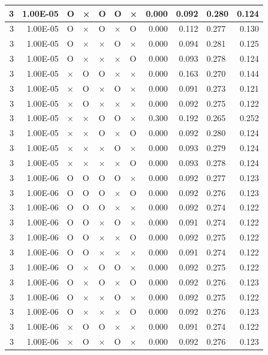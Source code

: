 \documentclass[11pt]{article}
\begin{document}
\begin{longtable}[h]{|r|r|l|l|l|l|l|r|r|l|r|}
3 & 1.00E-05 & O & × & O & O & × & 0.000 & 0.092 & 0.280 & 0.124 \\ \hline
3 & 1.00E-05 & O & × & O & × & O & 0.000 & 0.112 & 0.277 & 0.130 \\ \hline
3 & 1.00E-05 & O & × & × & O & × & 0.000 & 0.094 & 0.281 & 0.125 \\ \hline
3 & 1.00E-05 & O & × & × & × & O & 0.000 & 0.093 & 0.278 & 0.124 \\ \hline
3 & 1.00E-05 & × & O & O & × & × & 0.000 & 0.163 & 0.270 & 0.144 \\ \hline
3 & 1.00E-05 & × & O & × & O & × & 0.000 & 0.091 & 0.273 & 0.121 \\ \hline
3 & 1.00E-05 & × & O & × & × & × & 0.000 & 0.092 & 0.275 & 0.122 \\ \hline
3 & 1.00E-05 & × & × & O & O & × & 0.300 & 0.192 & 0.265 & 0.252 \\ \hline
3 & 1.00E-05 & × & × & O & × & O & 0.000 & 0.092 & 0.280 & 0.124 \\ \hline
3 & 1.00E-05 & × & × & × & O & × & 0.000 & 0.093 & 0.279 & 0.124 \\ \hline
3 & 1.00E-05 & × & × & × & × & O & 0.000 & 0.093 & 0.278 & 0.124 \\ \hline
3 & 1.00E-06 & O & O & O & O & × & 0.000 & 0.092 & 0.277 & 0.123 \\ \hline
3 & 1.00E-06 & O & O & O & × & O & 0.000 & 0.092 & 0.276 & 0.123 \\ \hline
3 & 1.00E-06 & O & O & O & × & × & 0.000 & 0.092 & 0.274 & 0.122 \\ \hline
3 & 1.00E-06 & O & O & × & O & × & 0.000 & 0.091 & 0.274 & 0.122 \\ \hline
3 & 1.00E-06 & O & O & × & × & O & 0.000 & 0.092 & 0.275 & 0.122 \\ \hline
3 & 1.00E-06 & O & O & × & × & × & 0.000 & 0.091 & 0.274 & 0.122 \\ \hline
3 & 1.00E-06 & O & × & O & O & × & 0.000 & 0.092 & 0.275 & 0.122 \\ \hline
3 & 1.00E-06 & O & × & O & × & O & 0.000 & 0.092 & 0.276 & 0.123 \\ \hline
3 & 1.00E-06 & O & × & × & O & × & 0.000 & 0.092 & 0.275 & 0.122 \\ \hline
3 & 1.00E-06 & O & × & × & × & O & 0.000 & 0.092 & 0.276 & 0.123 \\ \hline
3 & 1.00E-06 & × & O & O & × & × & 0.000 & 0.091 & 0.274 & 0.122 \\ \hline
3 & 1.00E-06 & × & O & × & O & × & 0.000 & 0.092 & 0.276 & 0.123 \\ \hline

\end{longtable}
\end{document}
